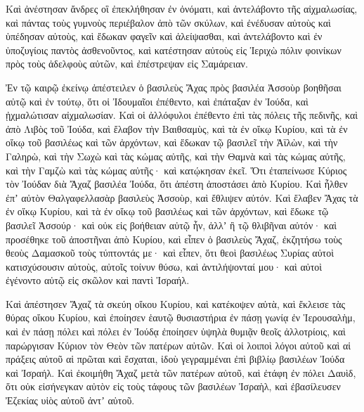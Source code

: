{Καὶ ἀνέστησαν ἄνδρες οἳ ἐπεκλήθησαν ἐν ὀνόματι, καὶ ἀντελάβοντο τῆς αἰχμαλωσίας, καὶ πάντας τοὺς γυμνοὺς περιέβαλον ἀπὸ τῶν σκύλων, καὶ ἐνέδυσαν αὐτοὺς καὶ ὑπέδησαν αὐτοὺς, καὶ ἔδωκαν φαγεῖν καὶ ἀλείψασθαι, καὶ ἀντελάβοντο καὶ ἐν ὑποζυγίοις παντὸς ἀσθενοῦντος, καὶ κατέστησαν αὐτοὺς εἰς Ἱεριχὼ πόλιν φοινίκων πρὸς τοὺς ἀδελφοὺς αὐτῶν, καὶ ἐπέστρεψαν εἰς Σαμάρειαν.
\par }{\PP {}Ἐν τῷ καιρῷ ἐκείνῳ ἀπέστειλεν ὁ βασιλεὺς Ἄχας πρὸς βασιλέα Ἀσσοὺρ βοηθῆσαι αὐτῷ
καὶ ἐν τούτῳ, ὅτι οἱ Ἰδουμαῖοι ἐπέθεντο, καὶ ἐπάταξαν ἐν Ἰούδα, καὶ ᾐχμαλώτισαν αἰχμαλωσίαν.
Καὶ οἱ ἀλλόφυλοι ἐπέθεντο ἐπὶ τὰς πόλεις τῆς πεδινῆς, καὶ ἀπὸ Λιβὸς τοῦ Ἰούδα, καὶ ἔλαβον τὴν Βαιθσαμὺς, καὶ τὰ ἐν οἴκῳ Κυρίου, καὶ τὰ ἐν οἴκῳ τοῦ βασιλέως καὶ τῶν ἀρχόντων, καὶ ἔδωκαν τῷ βασιλεῖ τὴν Ἀϊλὼν, καὶ τὴν Γαληρὼ, καὶ τὴν Σωχὼ καὶ τὰς κώμας αὐτῆς, καὶ τὴν Θαμνὰ καὶ τὰς κώμας αὐτῆς, καὶ τὴν Γαμζὼ καὶ τὰς κώμας αὐτῆς· καὶ κατῴκησαν ἐκεῖ.
Ὅτι ἐταπείνωσε Κύριος τὸν Ἰούδαν διὰ Ἄχαζ βασιλέα Ἰούδα, ὅτι ἀπέστη ἀποστάσει ἀπὸ Κυρίου.
Καὶ ἦλθεν ἐπʼ αὐτὸν Θαλγαφελλασὰρ βασιλεὺς Ἀσσοὺρ, καὶ ἔθλιψεν αὐτόν.
Καὶ ἔλαβεν Ἄχας τὰ ἐν οἴκῳ Κυρίου, καὶ τὰ ἐν οἴκῳ τοῦ βασιλέως καὶ τῶν ἀρχόντων, καὶ ἔδωκε τῷ βασιλεῖ Ἀσσούρ· καὶ οὐκ εἰς βοήθειαν αὐτῷ ἦν,
ἀλλʼ ἢ τῷ θλιβῆναι αὐτόν· καὶ προσέθηκε τοῦ ἀποστῆναι ἀπὸ Κυρίου, καὶ εἶπεν ὁ βασιλεὺς Ἄχαζ,
ἐκζητήσω τοὺς θεοὺς Δαμασκοῦ τοὺς τύπτοντάς με· καὶ εἶπεν, ὅτι θεοὶ βασιλέως Συρίας αὐτοὶ κατισχύσουσιν αὐτοὺς, αὐτοῖς τοίνυν θύσω, καὶ ἀντιλήψονταί μου· καὶ αὐτοὶ ἐγένοντο αὐτῷ εἰς σκῶλον καὶ παντὶ Ἰσραήλ.
\par }{\PP {}Καὶ ἀπέστησεν Ἄχαζ τὰ σκεύη οἴκου Κυρίου, καὶ κατέκοψεν αὐτὰ, καὶ ἔκλεισε τὰς θύρας οἴκου Κυρίου, καὶ ἐποίησεν ἑαυτῷ θυσιαστήρια ἐν πάσῃ γωνίᾳ ἐν Ἱερουσαλὴμ,
καὶ ἐν πάσῃ πόλει καὶ πόλει ἐν Ἰούδᾳ ἐποίησεν ὑψηλὰ θυμιᾷν θεοῖς ἀλλοτρίοις, καὶ παρώργισαν Κύριον τὸν Θεὸν τῶν πατέρων αὐτῶν.
Καὶ οἱ λοιποὶ λόγοι αὐτοῦ καὶ αἱ πράξεις αὐτοῦ αἱ πρῶται καὶ ἔσχαται, ἰδοὺ γεγραμμέναι ἐπὶ βιβλίῳ βασιλέων Ἰούδα καὶ Ἰσραήλ.
Καὶ ἐκοιμήθη Ἄχαζ μετὰ τῶν πατέρων αὐτοῦ, καὶ ἐτάφη ἐν πόλει Δαυὶδ, ὅτι οὐκ εἰσήνεγκαν αὐτὸν εἰς τοὺς τάφους τῶν βασιλέων Ἰσραὴλ, καὶ ἐβασίλευσεν Ἐζεκίας υἱὸς αὐτοῦ ἀντʼ αὐτοῦ.

}
